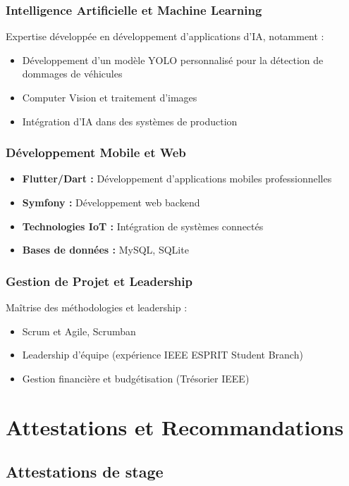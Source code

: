 \documentclass[12pt,a4paper]{report}
\begin{document}
\subsection{Intelligence Artificielle et Machine Learning}
Expertise développée en développement d'applications d'IA, notamment :
\begin{itemize}
    \item Développement d'un modèle YOLO personnalisé pour la détection de dommages de véhicules
    \item Computer Vision et traitement d'images
    \item Intégration d'IA dans des systèmes de production
\end{itemize}

\subsection{Développement Mobile et Web}
\begin{itemize}
    \item \textbf{Flutter/Dart :} Développement d'applications mobiles professionnelles
    \item \textbf{Symfony :} Développement web backend
    \item \textbf{Technologies IoT :} Intégration de systèmes connectés
    \item \textbf{Bases de données :} MySQL, SQLite
\end{itemize}

\subsection{Gestion de Projet et Leadership}
Maîtrise des méthodologies et leadership :
\begin{itemize}
    \item Scrum et Agile, Scrumban
    \item Leadership d'équipe (expérience IEEE ESPRIT Student Branch)
    \item Gestion financière et budgétisation (Trésorier IEEE)
\end{itemize}

\chapter{Attestations et Recommandations}

\section{Attestations de stage}
\end{document}
